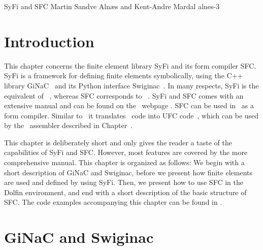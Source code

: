               {SyFi and SFC}
              {Martin Sandve Aln\ae s and Kent-Andre Mardal}
              {alnes-3}

\renewcommand{\AA}{\mathbf{A}}
\newcommand{\LL}{\mathbf{L}}
\newcommand{\JJ}{\mathbf{J}}

\section{Introduction}

This chapter concerns the finite element library SyFi and its form compiler SFC. 
SyFi is a framework for defining finite elements symbolically, using the 
C++ library GiNaC~\cite{BauerFrinkKreckel2000} and its Python interface Swiginac~\cite{www:swiginac}. In many respects, SyFi is 
the equivalent of \fiat~\cite{Kirby2006}, whereas SFC corresponds to \ffc~\cite{KirbyLogg2008b,Logg2007d}. SyFi and SFC comes with
an extensive manual \cite{AlnaesMardal2009a} and can be found on the \fenics\ webpage \cite{AlnaesMardal2009}. 
SFC can be used in \fenics\ as a form compiler. Similar to \ffc\ it translates \ufl\ code
into UFC code~\cite{logg-4,AlnaesLangtangenEtAl2007, AlnaesLoggEtAl2009}, which can be used by the \dolfin\ assembler described in Chapter~\cite{logg-3}. 

This chapter is deliberately short and only gives the reader a taste of the capabilities of SyFi and SFC. 
However, most features are covered by the more comprehensive manual. 
This chapter is organized as follows: We begin with a short description of GiNaC 
and Swiginac, before we present how finite elements are used and defined by using SyFi.   
Then, we present how to use SFC in the Dolfin environment, and end with a short description of the basic structure of SFC. 
The code examples accompanying this chapter can be found in  
.

\section{GiNaC and Swiginac}

